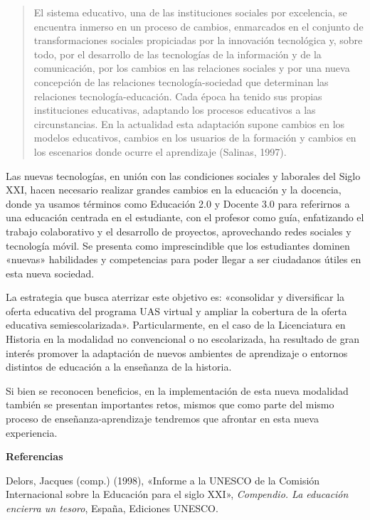 \begin{quotation}
El sistema educativo, una de las instituciones sociales por 
excelencia, se encuentra inmerso en un proceso de cambios, enmarcados 
en el conjunto de transformaciones  sociales propiciadas por la 
innovación tecnológica y, sobre todo, por el desarrollo de las 
tecnologías de la información y de la comunicación, por los cambios en 
las relaciones sociales y por una nueva concepción de las relaciones 
tecnología-sociedad que determinan las relaciones tecnología-educación. 
Cada época ha tenido sus propias instituciones educativas, adaptando 
los procesos educativos a las circunstancias. En la actualidad esta 
adaptación supone cambios en los modelos educativos, cambios en los 
usuarios de la formación y cambios en los escenarios donde ocurre el 
aprendizaje (Salinas, 1997).
\end{quotation}

Las nuevas tecnologías, en unión con las condiciones sociales y 
laborales del Siglo XXI, hacen necesario realizar grandes cambios en la 
educación y la docencia, donde ya usamos términos como Educación 2.0 y Docente 
3.0 para referirnos a una educación centrada en el estudiante, con el 
profesor como guía, enfatizando el trabajo colaborativo y el desarrollo de 
proyectos, aprovechando redes sociales y tecnología móvil. Se presenta 
como imprescindible que los estudiantes dominen «nuevas» habilidades y 
competencias para poder llegar a ser ciudadanos útiles en esta nueva 
sociedad.

La estrategia que busca aterrizar este objetivo es: «consolidar y 
diversificar la oferta educativa del programa UAS virtual y ampliar la 
cobertura de la oferta educativa semiescolarizada». Particularmente, en 
el caso de la Licenciatura en Historia en la modalidad no convencional 
o no escolarizada, ha resultado de gran interés promover la adaptación 
de nuevos ambientes de aprendizaje o entornos distintos de educación a 
la enseñanza de la historia.

Si bien se reconocen beneficios, en la implementación de esta nueva 
modalidad también se presentan importantes retos, mismos que como parte 
del mismo proceso de enseñanza-aprendizaje tendremos que afrontar en esta 
nueva experiencia.
\newpage

{\bfseries Referencias}

Delors, Jacques (comp.) (1998), «Informe a la UNESCO de la Comisión Internacional sobre la Educación para el siglo XXI», \textit{Compendio. La educación encierra un tesoro}, España, Ediciones UNESCO\@. 

